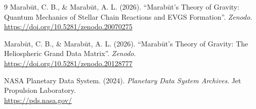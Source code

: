 \documentclass[11pt, a4paper]{article}
\begin{document}
\begin{thebibliography}{9}
  Marab\={u}t, C. B., \& Marab\={u}t, A. L. (2026). ``Marab\={u}t's Theory of Gravity: Quantum Mechanics of Stellar Chain Reactions and EVGS Formation''. \textit{Zenodo}. \\
  \url{https://doi.org/10.5281/zenodo.20070275}

  Marab\={u}t, C. B., \& Marab\={u}t, A. L. (2026). ``Marab\={u}t's Theory of Gravity: The Heliospheric Grand Data Matrix''. \textit{Zenodo}. \\
  \url{https://doi.org/10.5281/zenodo.20128777}

  NASA Planetary Data System. (2024). \textit{Planetary Data System Archives}. Jet Propulsion Laboratory. \\
  \url{https://pds.nasa.gov/}

\end{thebibliography}
\end{document}

